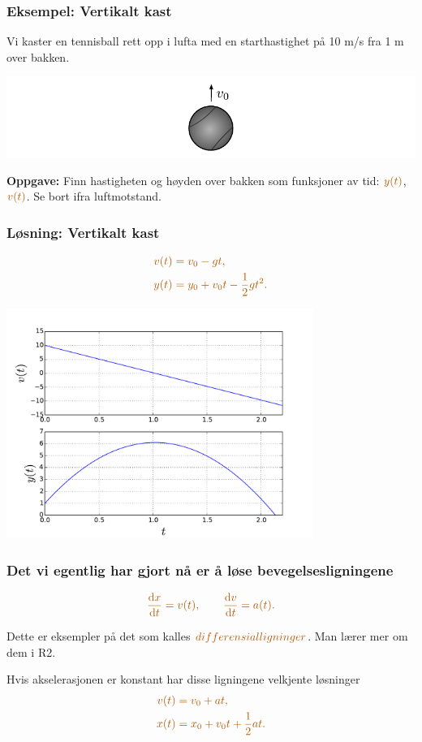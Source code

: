 \documentclass[english, 12pt]{beamer}
\newcommand{\alrt}{\color{AlertColor}}
\renewcommand{\d}{\textrm{d}}
\begin{document}
\begin{frame}
\frametitle{Eksempel: Vertikalt kast}

Vi kaster en tennisball rett opp i lufta med en starthastighet på 10 m/s fra 1 m over bakken.

\begin{center}
\includegraphics[width=\textwidth]{tennisball}
\end{center}

\textbf{Oppgave:} Finn hastigheten og høyden over bakken som funksjoner av tid: $\alrt y(t)$, $\alrt v(t)$. Se bort ifra luftmotstand.
\end{frame}

\begin{frame}
\frametitle{Løsning: Vertikalt kast}

\vspace{-1cm}

\begin{align*}
\alrt v(t) &\alrt=  v_0 - gt, \\
\alrt y(t) &\alrt=  y_0 + v_0t - \frac{1}{2}gt^2.
\end{align*}

\vspace{-0.5cm}

\begin{center}
\includegraphics[width=0.75\textwidth]{solvert}
\end{center}
\end{frame}

\begin{frame}
\frametitle{Det vi egentlig har gjort nå er å løse bevegelsesligningene}

$$\alrt \frac{\d x}{\d t} = v(t), \qquad \frac{\d v}{\d t} = a(t).$$

Dette er eksempler på det som kalles $\alrt differensialligninger$. Man lærer mer om dem i R2.

 {
Hvis akselerasjonen er konstant har disse ligningene velkjente løsninger
\begin{align*}
\alrt v(t) &\alrt= v_0 + at,\\
\alrt x(t) &\alrt= x_0 + v_0t + \frac{1}{2}at.	
\end{align*}
}
\end{frame}
\end{document}
